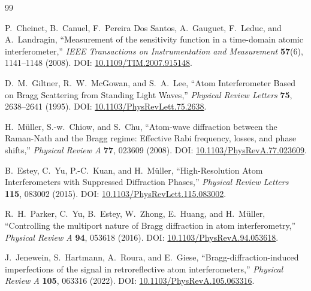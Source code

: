 \documentclass[11pt,a4paper]{article}
\begin{document}
\begin{thebibliography}{99}

P.~Cheinet, B.~Canuel, F.~Pereira Dos Santos, A.~Gauguet, F.~Leduc, and A.~Landragin,
``Measurement of the sensitivity function in a time-domain atomic interferometer,''
\textit{IEEE Transactions on Instrumentation and Measurement} \textbf{57}(6), 1141--1148 (2008).
DOI: \href{https://doi.org/10.1109/TIM.2007.915148}{10.1109/TIM.2007.915148}.

D.~M.~Giltner, R.~W.~McGowan, and S.~A.~Lee,
``Atom Interferometer Based on Bragg Scattering from Standing Light Waves,''
\textit{Physical Review Letters} \textbf{75}, 2638--2641 (1995).
DOI: \href{https://doi.org/10.1103/PhysRevLett.75.2638}{10.1103/PhysRevLett.75.2638}.

H.~M\"uller, S.-w.~Chiow, and S.~Chu,
``Atom-wave diffraction between the Raman-Nath and the Bragg regime: Effective Rabi frequency, losses, and phase shifts,''
\textit{Physical Review A} \textbf{77}, 023609 (2008).
DOI: \href{https://doi.org/10.1103/PhysRevA.77.023609}{10.1103/PhysRevA.77.023609}.

B.~Estey, C.~Yu, P.-C.~Kuan, and H.~M\"uller,
``High-Resolution Atom Interferometers with Suppressed Diffraction Phases,''
\textit{Physical Review Letters} \textbf{115}, 083002 (2015).
DOI: \href{https://doi.org/10.1103/PhysRevLett.115.083002}{10.1103/PhysRevLett.115.083002}.

R.~H.~Parker, C.~Yu, B.~Estey, W.~Zhong, E.~Huang, and H.~M\"uller,
``Controlling the multiport nature of Bragg diffraction in atom interferometry,''
\textit{Physical Review A} \textbf{94}, 053618 (2016).
DOI: \href{https://doi.org/10.1103/PhysRevA.94.053618}{10.1103/PhysRevA.94.053618}.

J.~Jenewein, S.~Hartmann, A.~Roura, and E.~Giese,
``Bragg-diffraction-induced imperfections of the signal in retroreflective atom interferometers,''
\textit{Physical Review A} \textbf{105}, 063316 (2022).
DOI: \href{https://doi.org/10.1103/PhysRevA.105.063316}{10.1103/PhysRevA.105.063316}.

\end{thebibliography}
\end{document}
